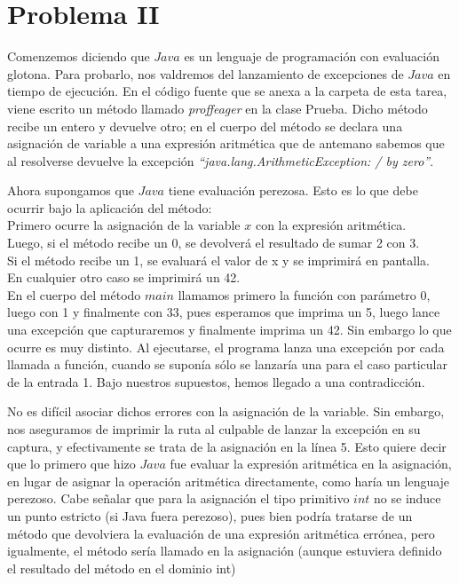 \documentclass[12pt]{article}
\begin{document}
\section*{Problema II}
Comenzemos diciendo que $Java$ es un lenguaje de programación con evaluación glotona. Para probarlo, nos valdremos del lanzamiento de excepciones de
$Java$ en tiempo de ejecución. En el código fuente que se anexa a la carpeta de esta tarea, viene escrito un método llamado \textit{proffeager} en la clase
Prueba. Dicho método recibe un entero y devuelve otro; en el cuerpo del método se declara una asignación de variable a una expresión aritmética que
de antemano sabemos que al resolverse devuelve la excepción \textit{``java.lang.ArithmeticException: / by zero''}. \par
Ahora supongamos que $Java$ tiene evaluación perezosa. Esto es lo que debe ocurrir bajo la aplicación del método:\\
Primero ocurre la asignación de la variable $x$ con la expresión aritmética.\\ Luego,
si el método recibe un 0, se devolverá el resultado de sumar 2 con 3. \\
Si el método recibe un 1, se evaluará el valor de x y se imprimirá en pantalla. \\
En cualquier otro caso se imprimirá un 42. \\
En el cuerpo del método $main$ llamamos primero la función con parámetro 0, luego con 1 y finalmente con 33, pues esperamos que imprima un 5, luego lance una excepción que capturaremos y finalmente imprima un 42.
Sin embargo lo que ocurre es muy distinto. Al ejecutarse, el programa lanza una excepción por cada llamada a función, cuando
se suponía sólo se lanzaría una para el caso particular de la entrada 1. Bajo nuestros supuestos, hemos llegado a una contradicción. \par
No es difícil asociar dichos errores
con la asignación de la variable. Sin embargo, nos aseguramos de imprimir la ruta al culpable de lanzar la excepción en su captura, y efectivamente
se trata de la asignación en la línea 5. Esto quiere decir que lo primero que hizo $Java$ fue evaluar la expresión aritmética en la asignación,
en lugar de asignar la operación aritmética directamente, como haría un lenguaje perezoso. Cabe señalar que para la asignación el tipo primitivo $int$
no se induce un punto estricto (si Java fuera perezoso), pues bien podría tratarse de un método  que devolviera la evaluación de una expresión
aritmética errónea, pero igualmente, el método sería llamado en la asignación (aunque estuviera definido el resultado del método en el dominio int)
\end{document}
